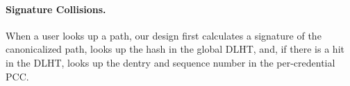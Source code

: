 




\paragraph{Signature Collisions.}
When a user looks up a path, our design first calculates a signature
of the canonicalized path, looks up the hash in the global DLHT,
and, if there is a hit in the DLHT, 
looks up the dentry and sequence number in the per-credential PCC.

